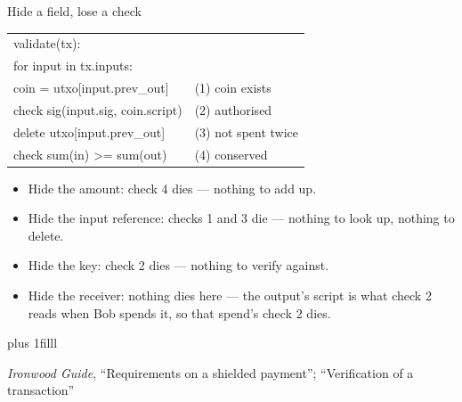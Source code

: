 \documentclass[aspectratio=169,11pt]{beamer}
\newcommand{\src}[1]{\par\vskip0pt plus 1filll
  {\fontsize{6}{7.2}\selectfont\color{arbdim}\raggedright #1\par}}
\begin{document}
\begin{frame}{Hide a field, lose a check}
{\ttfamily\small
\begin{tabular}{@{}l@{\qquad}l@{}}
validate(tx): & \\
\quad for input in tx.inputs: & \\
\quad\quad \alert<3->{coin = utxo[input.prev\_out]}
  & \normalfont (1) coin exists \\
\quad\quad \alert<4->{check sig(input.sig, coin.script)}
  & \normalfont (2) authorised \\
\quad\quad \alert<3->{delete utxo[input.prev\_out]}
  & \normalfont (3) not spent twice \\
\quad \alert<2->{check sum(in) >= sum(out)}
  & \normalfont (4) conserved \\
\end{tabular}}
\medskip
\begin{itemize}
  \item<2-> \alert{Hide the amount}: check 4 dies --- nothing to add up.
  \item<3-> \alert{Hide the input reference}: checks 1 and 3 die ---
    nothing to look up, nothing to delete.
  \item<4-> \alert{Hide the key}: check 2 dies --- nothing to verify
    against.
  \item<5-> \alert{Hide the receiver}: nothing dies here --- the output's
    script is what check 2 reads when Bob spends it, so that spend's
    check 2 dies.
\end{itemize}
\medskip
{}
\src{\emph{Ironwood Guide}, ``Requirements on a shielded payment'';
  ``Verification of a transaction''}
\end{frame}
\end{document}
